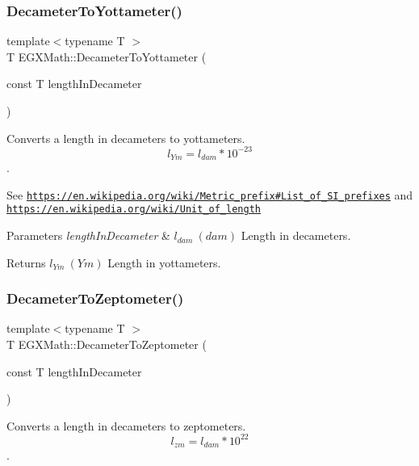 \subsubsection{\texorpdfstring{Decameter\+To\+Yottameter()}{DecameterToYottameter()}}
{\footnotesize\ttfamily template$<$typename T $>$ \\
T E\+G\+X\+Math\+::\+Decameter\+To\+Yottameter (\begin{DoxyParamCaption}\item[{const T}]{length\+In\+Decameter }\end{DoxyParamCaption})}



Converts a length in decameters to yottameters. \[ l_{Ym}=l_{dam} * 10^{-23} \]. 

See \href{https://en.wikipedia.org/wiki/Metric_prefix#List_of_SI_prefixes}{\tt https\+://en.\+wikipedia.\+org/wiki/\+Metric\+\_\+prefix\#\+List\+\_\+of\+\_\+\+S\+I\+\_\+prefixes} and \href{https://en.wikipedia.org/wiki/Unit_of_length}{\tt https\+://en.\+wikipedia.\+org/wiki/\+Unit\+\_\+of\+\_\+length} 
\begin{DoxyParams}{Parameters}
{\em length\+In\+Decameter} & $ l_{dam}\ (dam)$ Length in decameters. \\
\hline
\end{DoxyParams}
\begin{DoxyReturn}{Returns}
$ l_{Ym}\ (Ym)$ Length in yottameters. 
\end{DoxyReturn}
\mbox{\label{group___e_g_x_math-_conversions-_length_conversions-_decameter-_s_i_gaa5ec7101e385d972cd3175fab39fd2c6}} 
\subsubsection{\texorpdfstring{Decameter\+To\+Zeptometer()}{DecameterToZeptometer()}}
{\footnotesize\ttfamily template$<$typename T $>$ \\
T E\+G\+X\+Math\+::\+Decameter\+To\+Zeptometer (\begin{DoxyParamCaption}\item[{const T}]{length\+In\+Decameter }\end{DoxyParamCaption})}



Converts a length in decameters to zeptometers. \[ l_{zm}=l_{dam} * 10^{22} \]. 

